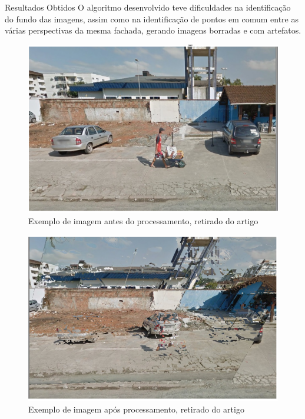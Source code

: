 \documentclass{beamer}
\begin{document}
    \begin{frame}[allowframebreaks]{Resultados Obtidos}
        O algoritmo desenvolvido teve dificuldades na identificação do fundo das imagens, assim como na identificação de pontos em comum entre as várias perspectivas da mesma fachada, gerando imagens borradas e com artefatos.
        
        \framebreak
        
        \begin{figure}
            \centering
            \includegraphics[scale=.4]{exemploE.png}
            \caption{Exemplo de imagem antes do processamento, retirado do artigo}
        \end{figure}
        
        \framebreak
        
        \begin{figure}
            \centering
            \includegraphics[scale=.4]{exemploD.png}
            \caption{Exemplo de imagem após processamento, retirado do artigo}
        \end{figure}
        
    \end{frame}
    
\end{document}
